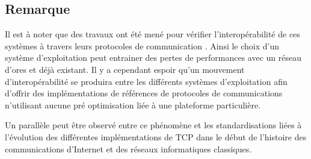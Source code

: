 \subsection{Remarque}

Il est à noter que des travaux ont été mené pour vérifier l'interopérabilité de
ces systèmes à travers leurs protocoles de communication
\cite{Eriksson09detailedsimulation, Eriksson:2009:CIT:1537614.1537650}. Ainsi
le choix d'un système d'exploitation peut entrainer des pertes de performances
avec un réseau d'ores et déjà existant. Il y a cependant espoir qu'un mouvement
d'interopérabilité se produira entre les différents systèmes d'exploitation
afin d'offrir des implémentations de références de protocoles de communications
n'utilisant aucune pré optimisation liée à une plateforme particulière.

Un parallèle peut être observé entre ce phénomène et les standardisations liées
à l'évolution des différentes implémentations de TCP dans le début de
l'histoire des communications d'Internet et des réseaux informatiques
classiques.
